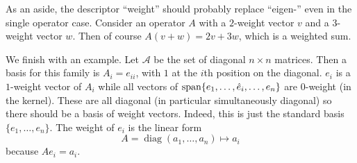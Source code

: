 As an aside, the descriptor ``weight'' should probably replace ``eigen-'' even in the single operator case.
Consider an operator $A$ with a $2$-weight vector $v$ and a $3$-weight vector $w$.
Then of course $A(v+w) = 2v + 3w$, which is a weighted sum.

We finish with an example.
Let $\mathcal{A}$ be the set of diagonal $n\times n$ matrices.
Then a basis for this family is $A_i = e_{ii}$, with $1$ at the $i$th position on the diagonal.
$e_i$ is a $1$-weight vector of $A_i$ while all vectors of $\operatorname{span}\{e_1,\dots,\hat{e}_i,\dots,e_n\}$ are $0$-weight (in the kernel).
These are all diagonal (in particular simultaneously diagonal) so there should be a basis of weight vectors.
Indeed, this is just the standard basis $\{e_1,\dots,e_n\}$.
The weight of $e_i$ is the linear form
\[
A = \operatorname{diag}(a_1,\dots,a_n) \mapsto a_i
\]
because $A e_i = a_i$.

